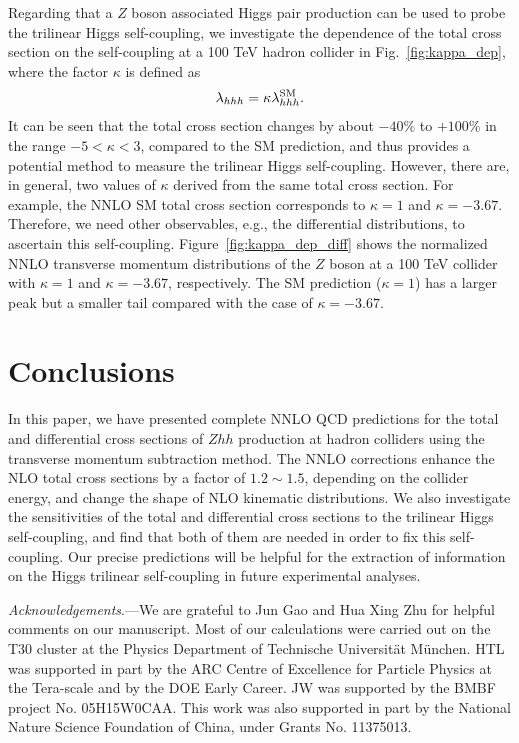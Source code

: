 \documentclass[a4paper,amsmath,preprintnumbers,showpacs,twocolumn,prl,superscriptaddress, nofootinbib]{revtex4}
\begin{document}
Regarding that a $Z$ boson associated Higgs pair production can be used to probe the trilinear Higgs self-coupling, we investigate the dependence of the total cross section on the self-coupling at a 100 TeV hadron collider in Fig.~\ref{fig:kappa_dep}, where the factor $\kappa$ is defined as
\begin{align}
\lambda_{hhh}=\kappa \lambda_{hhh}^{\rm SM}.
\end{align}
It can be seen  that the total cross section changes by about $-40\%$ to $+100\%$ in the range $-5<\kappa<3$, compared to the SM prediction, 
and thus provides a potential method to measure the trilinear Higgs self-coupling. 
However,   there are, in general, two values of $\kappa$ derived from the same total cross section. 
For example, the NNLO SM total cross section corresponds to $\kappa=1$ and $\kappa=-3.67$.
Therefore, we need other observables, e.g., the differential distributions, to ascertain this self-coupling. Figure~\ref{fig:kappa_dep_diff} shows the normalized NNLO transverse momentum distributions of the $Z$ boson at a 100 TeV collider with  $\kappa=1$ and $\kappa=-3.67$, respectively. 
The SM prediction ($\kappa=1$) has a larger peak but a smaller tail compared with the case of  $\kappa=-3.67$. 


\section{Conclusions}
In this paper, we have presented complete NNLO QCD predictions for the total and differential cross sections of $Zhh$ production at hadron colliders  using the transverse momentum  subtraction method.
The NNLO corrections enhance the NLO total cross sections by a factor of $1.2\sim 1.5$, depending on the collider energy, 
and change the shape of NLO kinematic distributions.
We also investigate the sensitivities of the total and differential cross sections to the trilinear Higgs self-coupling,
and find that both of them are needed in order to fix  this self-coupling. 
Our precise predictions will be  helpful for the extraction of information on the Higgs trilinear self-coupling in future experimental analyses.








\emph{Acknowledgements}.---We are grateful to Jun Gao and Hua Xing Zhu for helpful comments on our manuscript. 
Most of our calculations were carried out on the T30 cluster  at the Physics Department of  Technische Universit\"at M\"unchen.
HTL was supported in part by the ARC Centre of Excellence for Particle Physics at the Tera-scale and by the DOE Early Career.
JW was supported by  the BMBF project No. 05H15W0CAA.
This work was also supported in part
by the National Nature Science Foundation of China,
under Grants No. 11375013.
\end{document}
